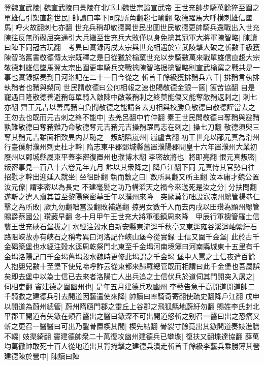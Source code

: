 登魏宣武陵|{
	魏宣武陵曰景陵在北邙山魏世宗謚宣武帝}
王世充帥步騎萬餘猝至圍之單雄信引槊直趨世民|{
	帥讀曰率下同槊所角翻趨七喻翻}
敬德躍馬大呼横刺雄信墜馬|{
	呼火故翻刺七亦翻}
世充兵稍却敬德翼世民出圍世民敬德更帥騎兵還戰出入世充陳往反無所礙屈突通引大兵繼至世充兵大敗僅以身免擒其冠軍大將軍陳智略|{
	陳讀曰陣下同冠古玩翻　考異曰實録丙戌太宗與世充相遇於宣武陵擊大破之斬數千級獲陳智略舊書敬德傳太宗既釋之是日從獵於榆窠世充以步騎數萬來戰單雄信直趨大宗敬德刺雄信墜馬翼太宗出圍更率騎兵交戰擒陳智略据擒智略則宣武榆窠之戰共是一事也實録据奏到日河洛記在二十一日今從之}
斬首千餘級獲排矟兵六千|{
	排矟言執排執矟者也矟與槊同}
世民謂敬德曰公何相報之速也賜敬德金銀一篋|{
	篋苦協翻}
自是寵遇日隆敬德善避矟每單騎入敵陳中敵叢矟刺之終莫能傷又能奪敵矟返刺之|{
	刺七亦翻}
齊王元吉以善馬矟自負聞敬德之能請各去刃相與校勝負敬德曰敬德謹當去之王勿去也既而元吉刺之終不能中|{
	去羌呂翻中竹仲翻}
秦王世民問敬德曰奪矟與避矟孰難敬德曰奪矟難乃命敬德奪元吉矟元吉操矟躍馬志在刺之|{
	操七刀翻}
敬德須臾三奪其矟元吉雖面相歎異内甚恥之　叛胡䧟嵐州|{
	嵐盧含翻}
初王世充以邴元真為滑州行臺僕射濮州刺史杜才幹|{
	隋志東平郡鄄城縣舊置濮陽郡開皇十六年置濮州大業初廢州以鄄城縣屬東平蓋李密復置州也濮博木翻}
李密故將也|{
	將即亮翻}
恨元真叛密|{
	叛密事見一百八十六卷元年九月}
詐以其衆降之|{
	降戶江翻下同}
元真恃其官勢自往招慰才幹出迎延入就坐|{
	坐徂卧翻}
執而數之曰|{
	數所具翻又所主翻}
汝本庸才魏公置汝元僚|{
	謂李密以為長史}
不建毫髪之功乃構滔天之禍今來送死是汝之分|{
	分扶問翻}
遂斬之遣人齎其首至黎陽祭密墓壬午以濮州來降　突厥莫賀咄設寇凉州總管楊恭仁擊之為所敗|{
	厥九勿翻咄當没翻敗補邁翻}
掠男女數千人而去丙戌以田瓚為顯州總管賜爵蔡國公|{
	瓚藏早翻}
冬十月甲午王世充大將軍張鎮周來降　甲辰行軍摠管羅士信襲王世充硤石堡拔之|{
	水經注穀水自新安縣東流逕千秋亭又東逕雍谷溪迴岫縈紆石路阻峽故亦有峽石之稱考異曰河洛記作峽山堡今從實録}
士信又圍千金堡|{
	此於古千金碣築堡也水經注穀水逕周乾祭門北東至千金堨河南境簿曰河南縣城東十五里有千金堨洛陽記曰千金堨舊堨穀水魏時更修此堨謂之千金堨}
堡中人罵之士信夜遣百餘人抱嬰兒數十至堡下使兒啼呼詐云從東都來歸羅總管既而相謂曰此千金堡也吾屬誤矣即去堡中以為士信已去來者洛陽亡人出兵追之士信伏兵於道伺其門開突入屠之|{
	伺相吏翻}
竇建德之圍幽州也|{
	是年五月建德兵攻幽州}
李藝告急于高開道開道帥二千騎救之建德兵引去開道因藝遣使來降|{
	帥讀曰率騎奇寄翻使疏史翻降戶江翻}
戊申以開道為蔚州總管|{
	蔚州隋鴈門郡之靈丘上谷郡之飛狐縣地蔚紆勿翻}
賜姓李氏封北平郡王開道有矢鏃在頰召醫出之醫曰鏃深不可出開道怒斬之别召一醫曰出之恐痛又斬之更召一醫醫曰可出乃鑿骨置楔其間|{
	楔先結翻}
骨裂寸餘竟出其鏃開道奏妓進膳不輟|{
	妓渠綺翻}
竇建德帥衆二十萬復攻幽州建德兵已攀堞|{
	復扶又翻堞達協翻}
薛萬均萬徹帥敢死士百人從地道出其背掩擊之建德兵潰走斬首千餘級李藝兵乘勝薄其營建德陳於營中|{
	陳讀曰陣}
